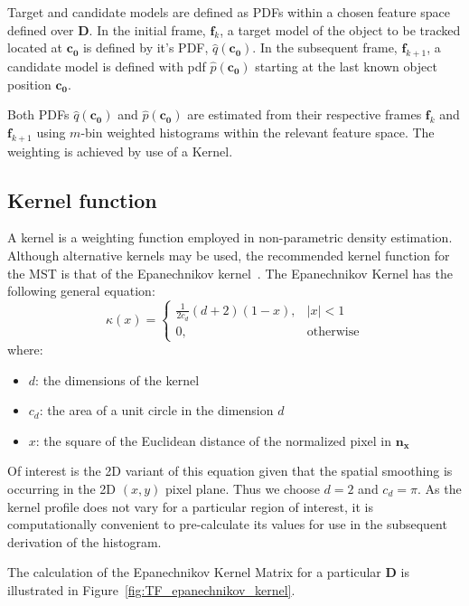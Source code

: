 Target and candidate models are defined as PDFs within a chosen feature
space defined over $\mathbf{D}$. In the initial frame, $\mathbf{f}_k$, a target
model of the object to be tracked located at $\mathbf{c_0}$ is defined by it's
PDF, $\hat{q}(\mathbf{c_0})$. In the subsequent frame, $\mathbf{f}_{k+1}$, a
candidate model is defined with pdf $\hat{p}(\mathbf{c_0})$ starting at the last
known object position $\mathbf{c_0}$. 

Both PDFs $\hat{q}(\mathbf{c_0})$ and $\hat{p}(\mathbf{c_0})$ are estimated from
their respective frames $\mathbf{f}_k$ and $\mathbf{f}_{k+1}$ using $m$-bin
weighted histograms within the relevant feature space. The weighting is achieved
by use of a Kernel. 

\subsection{Kernel function}
A kernel is a weighting function employed in non-parametric density estimation.
Although alternative kernels may be used, the recommended kernel function for the MST is that of the
Epanechnikov kernel~\cite{Comaniciu2002}.
The Epanechnikov Kernel has the following general equation:
\begin{equation}
    \kappa(x)=
    \begin{cases}
        \frac{1}{2c_d}(d+2)(1-x), & |x|<1 \\
        0, & \text{otherwise}
    \end{cases}
\end{equation}
where:
\begin{itemize}
   \item $d$: the dimensions of the kernel
   \item $c_d$: the area of a unit circle in the dimension $d$
   \item $x$: the square of the Euclidean distance of the normalized pixel in
       $\mathbf{n_x}$
\end{itemize}

Of interest is the 2D variant of this equation given that the spatial smoothing
is occurring in the 2D $(x,y)$ pixel plane. Thus we choose $d=2$ and $c_d=\pi$.
As the kernel profile does not vary for a particular region of interest, it is
computationally convenient to pre-calculate its values for use in the subsequent
derivation of the histogram.

The calculation of the Epanechnikov Kernel Matrix for a particular $\mathbf{D}$ is
illustrated in Figure~\ref{fig:TF_epanechnikov_kernel}.


